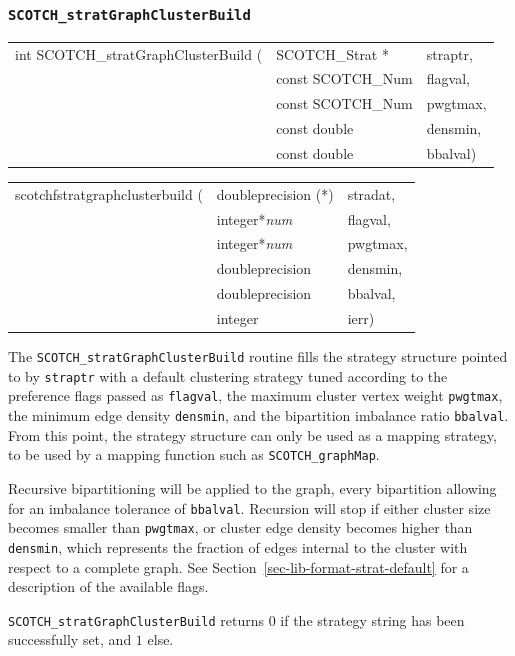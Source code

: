 \subsubsection{{\tt SCOTCH\_stratGraphClusterBuild}}
\label{sec-lib-func-stratgraphclusterbuild}

\begin{itemize}
\progsyn

{\tt\begin{tabular}{l@{}ll}
int SCOTCH\_stratGraphClusterBuild ( & SCOTCH\_Strat *   & straptr, \\
                                     & const SCOTCH\_Num & flagval, \\
                                     & const SCOTCH\_Num & pwgtmax, \\
                                     & const double      & densmin, \\
                                     & const double      & bbalval)
\end{tabular}}

{\tt\begin{tabular}{l@{}ll}
scotchfstratgraphclusterbuild ( & doubleprecision (*) & stradat, \\
                                & integer*{\it num}   & flagval, \\
                                & integer*{\it num}   & pwgtmax, \\
                                & doubleprecision     & densmin, \\
                                & doubleprecision     & bbalval, \\
                                & integer             & ierr)
\end{tabular}}

\progdes

The {\tt SCOTCH\_stratGraphClusterBuild} routine fills the strategy
structure pointed to by {\tt straptr} with a default clustering
strategy tuned according to the preference flags passed as
{\tt flagval}, the maximum cluster vertex weight {\tt pwgtmax},
the minimum edge density {\tt densmin}, and the bipartition imbalance
ratio {\tt bbalval}. From this point, the strategy structure
can only be used as a mapping strategy, to be used by a mapping
function such as {\tt SCOTCH\_\lbt graph\lbt Map}.

Recursive bipartitioning will be applied to the graph, every
bipartition allowing for an imbalance tolerance of {\tt bbalval}.
Recursion will stop if either cluster size becomes smaller than
{\tt pwgtmax}, or cluster edge density becomes higher than
{\tt densmin}, which represents the fraction of edges internal to the
cluster with respect to a complete graph. See
Section~\ref{sec-lib-format-strat-default} for a description of the
available flags.

\progret

{\tt SCOTCH\_stratGraphClusterBuild} returns $0$ if the strategy string
has been successfully set, and $1$ else.
\end{itemize}

